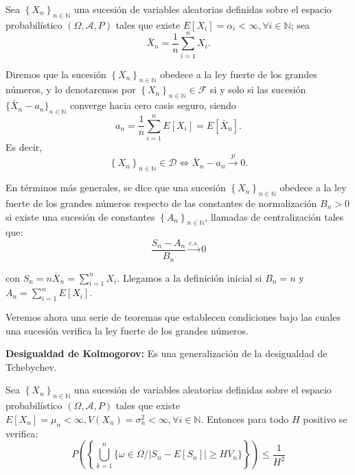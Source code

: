 \begin{definicion}
Sea $ \left\{X_n\right\}_{n\in\mathbb{N}}$ una sucesi\'on de variables aleatorias definidas sobre el espacio probabil\'istico $\left(\Omega,\mathcal{A}, P\right) $ tales que existe $E[X_i]=\alpha_i<\infty,\forall i \in\mathbb{N}$; sea
\begin{equation*}
\bar{X}_n=\dfrac{1}{n}\sum_{i=1}^{n}X_i.
\end{equation*}

Diremos que la sucesi\'on $ \left\{X_n\right\}_{n\in\mathbb{N}}$ obedece a la ley fuerte de los grandes n\'umeros, y lo denotaremos por $ \left\{X_n\right\}_{n\in\mathbb{N}}\in\mathscr{F}$ si y solo si las sucesi\'on $\{\bar{X}_n-a_n\}_{n\in\mathbb{N}}$ converge hacia cero casis seguro, siendo 
\begin{equation*}
a_n=\dfrac{1}{n}\sum_{i=1}^{n}E[X_i]=E[\bar{X}_n].
\end{equation*}
Es decir,
\begin{equation*}
\left\{X_n\right\}_{n\in\mathbb{N}}\in\mathscr{D}\Leftrightarrow \bar{X}_n-a_n\overset{p}{\to} 0.
\end{equation*}
\end{definicion}

En t\'erminos m\'as generales, se dice que una sucesi\'on $ \left\{X_n\right\}_{n\in\mathbb{N}}$ obedece a la ley fuerte de los grandes n\'umeros respecto de las constantes de normalizaci\'on $B_n>0$ si existe una sucesi\'on de constantes $ \left\{A_n\right\}_{n\in\mathbb{N}}$, llamadas de centralizaci\'on tales que:
\begin{equation*}
\dfrac{S_n-A_n}{B_n}\overset{c.s.}{\to}0
\end{equation*}

con $S_n=n\bar{X}_n=\sum_{i=1}^{n}X_i$. Llegamos a la definici\'on inicial si $B_n=n$ y $A_n=\sum_{i=1}^{n}E[X_i]$.

Veremos ahora una serie de teoremas que establecen condiciones bajo las cuales una sucesi\'on verifica la ley fuerte de los grandes n\'umeros.


\textbf{Desigualdad de Kolmogorov:} Es una generalizaci\'on de la desigualdad de Tchebychev.

Sea $ \left\{X_n\right\}_{n\in\mathbb{N}}$ una sucesi\'on de variables aleatorias definidas sobre el espacio probabil\'istico $\left(\Omega,\mathcal{A}, P\right) $ tales que existe $E[X_n]=\mu_n<\infty, V(X_n)=\sigma_n^2<\infty,\forall i \in\mathbb{N}$. Entonces para todo $H$ positivo se verifica:
\begin{equation*}
P\left(\left\{\bigcup_{k=1}^n\{\omega\in\Omega/\left|S_n-E[S_n]\right|\geq HV_n\}\right\}\right)\leq\dfrac{1}{H^2}
\end{equation*}

